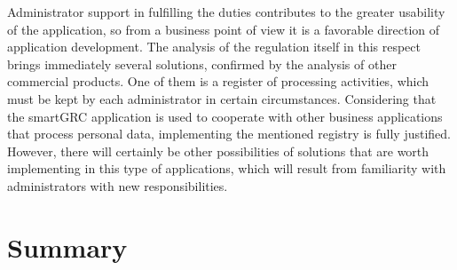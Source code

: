 \documentclass[en, noamssymb]{mgr}
\begin{document}
\indent Administrator support in fulfilling the duties contributes to the greater usability of the application, so from a business point of view it is a favorable direction of application development. The analysis of the regulation itself in this respect brings immediately several solutions, confirmed by the analysis of other commercial products. One of them is a register of processing activities, which must be kept by each administrator in certain circumstances. Considering that the smartGRC application is used to cooperate with other business applications that process personal data, implementing the mentioned registry is fully justified. However, there will certainly be other possibilities of solutions that are worth implementing in this type of applications, which will result from familiarity with administrators with new responsibilities.

\chapter{Summary}
\label{sec:Podsumowanie}
\end{document}
